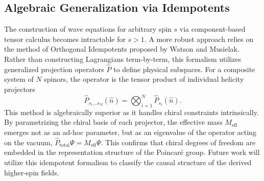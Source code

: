 \subsection{Algebraic Generalization via Idempotents}

The construction of wave equations for arbitrary spin $s$ via component-based
tensor calculus becomes intractable for $s > 1$. A more robust approach relies
on the method of Orthogonal Idempotents proposed by Watson and Musielak. Rather
than constructing Lagrangians term-by-term, this formalism utilizes generalized
projection operators $\hat{P}$ to define physical subspaces. For a composite
system of $N$ spinors, the operator is the tensor product of individual helicity
projectors
\begin{equation}
	\hat{P}_{s_1 \dots s_N}\left(\hat{n}\right) = \bigotimes_{i=1}^N
	\hat{P}_{s_i}\left(\hat{n}\right).
\end{equation}
This method is algebraically superior as it handles chiral constraints
intrinsically. By parametrizing the chiral basis of each projector, the
effective mass $M_{\text{eff}}$ emerges not as an ad-hoc parameter, but as an
eigenvalue of the operator acting on the vacuum, $\hat{P}_{\text{total}} \Psi =
M_{\text{eff}} \Psi$. This confirms that chiral degrees of freedom are embedded
in the representation structure of the Poincar\'{e} group. Future work will
utilize this idempotent formalism to classify the causal structure of
the derived higher-spin fields.
